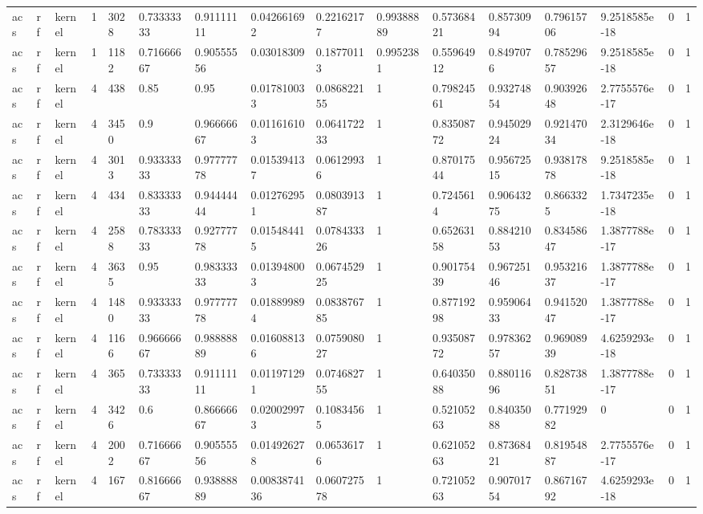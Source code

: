 \begin{tabular}{llllllllllllllll}
acs & rf & kernel & 1 & 3028 & 0.73333333 & 0.91111111 & 0.042661692 & 0.22162177 & 0.99388889 & 0.57368421 & 0.85730994 & 0.79615706 & 9.2518585e-18 & 0 & 1 \\
acs & rf & kernel & 1 & 1182 & 0.71666667 & 0.90555556 & 0.03018309 & 0.18770113 & 0.9952381 & 0.55964912 & 0.8497076 & 0.78529657 & 9.2518585e-18 & 0 & 1 \\
acs & rf & kernel & 4 & 438 & 0.85 & 0.95 & 0.017810033 & 0.086822155 & 1 & 0.79824561 & 0.93274854 & 0.90392648 & 2.7755576e-17 & 0 & 1 \\
acs & rf & kernel & 4 & 3450 & 0.9 & 0.96666667 & 0.011616103 & 0.064172233 & 1 & 0.83508772 & 0.94502924 & 0.92147034 & 2.3129646e-18 & 0 & 1 \\
acs & rf & kernel & 4 & 3013 & 0.93333333 & 0.97777778 & 0.015394137 & 0.06129936 & 1 & 0.87017544 & 0.95672515 & 0.93817878 & 9.2518585e-18 & 0 & 1 \\
acs & rf & kernel & 4 & 434 & 0.83333333 & 0.94444444 & 0.012762951 & 0.080391387 & 1 & 0.7245614 & 0.90643275 & 0.8663325 & 1.7347235e-18 & 0 & 1 \\
acs & rf & kernel & 4 & 2588 & 0.78333333 & 0.92777778 & 0.015484415 & 0.078433326 & 1 & 0.65263158 & 0.88421053 & 0.83458647 & 1.3877788e-17 & 0 & 1 \\
acs & rf & kernel & 4 & 3635 & 0.95 & 0.98333333 & 0.013948003 & 0.067452925 & 1 & 0.90175439 & 0.96725146 & 0.95321637 & 1.3877788e-17 & 0 & 1 \\
acs & rf & kernel & 4 & 1480 & 0.93333333 & 0.97777778 & 0.018899894 & 0.083876785 & 1 & 0.87719298 & 0.95906433 & 0.94152047 & 1.3877788e-17 & 0 & 1 \\
acs & rf & kernel & 4 & 1166 & 0.96666667 & 0.98888889 & 0.016088136 & 0.075908027 & 1 & 0.93508772 & 0.97836257 & 0.96908939 & 4.6259293e-18 & 0 & 1 \\
acs & rf & kernel & 4 & 365 & 0.73333333 & 0.91111111 & 0.011971291 & 0.074682755 & 1 & 0.64035088 & 0.88011696 & 0.82873851 & 1.3877788e-17 & 0 & 1 \\
acs & rf & kernel & 4 & 3426 & 0.6 & 0.86666667 & 0.020029973 & 0.10834565 & 1 & 0.52105263 & 0.84035088 & 0.77192982 & 0 & 0 & 1 \\
acs & rf & kernel & 4 & 2002 & 0.71666667 & 0.90555556 & 0.014926278 & 0.06536176 & 1 & 0.62105263 & 0.87368421 & 0.81954887 & 2.7755576e-17 & 0 & 1 \\
acs & rf & kernel & 4 & 167 & 0.81666667 & 0.93888889 & 0.0083874136 & 0.060727578 & 1 & 0.72105263 & 0.90701754 & 0.86716792 & 4.6259293e-18 & 0 & 1 \\

\end{tabular}
